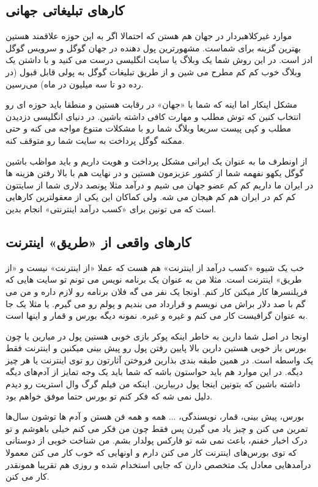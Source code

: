 \subsection*{کارهای تبلیغاتی جهانی}
موارد غیرکلاهبردار در جهان هم هستن که احتمالا اگر به این حوزه علاقمند هستین بهترین گزینه برای شماست. مشهورترین پول دهنده در جهان گوگل و سرویس گوگل ادز است. در این روش شما یک وبلاگ یا سایت انگلیسی درست می کنید و با داشتن یک وبلاگ خوب کم کم مطرح می شین و از طریق تبلیغات گوگل به پولی قابل قبول (در رده دو تا سه میلیون در ماه)‌ می‌رسین.

 مشکل اینکار اما اینه که شما با «جهان» در رقابت هستین و منطقا باید حوزه ای رو انتخاب کنین که توش مطلب و مهارت کافی داشته باشین. در دنیای انگلیسی دزدیدن مطلب و کپی پیست سریعا وبلاگ شما رو با مشکلات متنوع مواجه می کنه و حتی ممکنه گوگل پرداخت به سایت شما رو متوقف کنه.

 از اونطرف ما به عنوان یک ایرانی مشکل پرداخت و هویت داریم و باید مواظب باشین گوگل یکهو نفهمه شما از کشور عزیزمون هستین و در نهایت هم با بالا رفتن هزینه ها در ایران ما داریم کم کم عضو جهان می شیم و درآمد مثلا پونصد دلاری شما از سایتتون کم کم در ایران هم کم هیجان می شه. ولی کماکان این یکی از معقولترین کارهایی است که می تونین برای «کسب درآمد اینترنتی» انجام بدین.
\subsection*{کارهای واقعی از «طریق» اینترنت}
خب یک شیوه «کسب درآمد از اینترنت» هم هست که عملا «از اینترنت» نیست و «از طریق» اینترنت است. مثلا من به عنوان یک برنامه نویس می تونم تو سایت هایی که فریلنسرها کار میکنن کار کنم. اونجا یک نفر می گه فلان برنامه رو لازم داره و من می گم با صد دلار براش می نویسم و قرارداد می بندیم و پولم رو می گیرم. یا مثلا یک جا به عنوان گرافیست کار می کنم و غیره و غیره. نمونه دیگه بورس و قمار و اینها است. 

اونجا در اصل شما دارین به خاطر اینکه پوکر بازی خوبی هستین پول در میارین یا چون بورس باز خوبی هستین دارین بالا پایین رفتن پول رو پیش بینی میکنین و اینترنت فقط یک واسطه است. در همین طبقه بندی بذارین فروختن آثارتون رو توی اینترنت یا هر چیز دیگه. در این موارد هم باید حواستون باشه که شما باید یک وجه تمایز از آدم‌های دیگه داشته باشین که بتونین اینجا پول دربیارین. اینکه من فیلم گرگ وال استریت رو دیدم دلیل نمی شه که فکر کنم تو بورس حتما موفق خواهم بود.

 بورس، پیش بینی، قمار، نویسندگی، ... همه و همه فن هستن و آدم ها توشون سال‌ها تمرین می کنن و چیز یاد می گیرن پس فقط چون من فکر می کنم خیلی باهوشم و تو درک اخبار خفنم، باعث نمی شه تو فارکس پولدار بشم. من شناخت خوبی از دوستانی که توی بورس‌های اینترنت کار می کنن دارم و اونهایی که خوب کار می کنن معمولا درآمدهایی معادل یک متخصص دارن که جایی استخدام شده و روزی هم تقریبا همونقدر کار می کنن.
